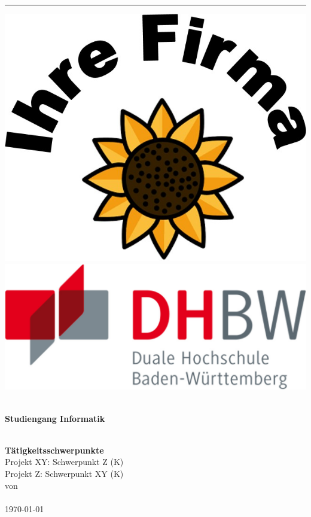 \begin{titlepage}
			\begin{center}
				\rule[0.5cm]{150mm}{0.2mm}
			\end{center}
			\hspace*{0.5cm}	
			\includegraphics[scale=0.2]{./img/Firmenlogo.jpg} \hfill
			\includegraphics[scale=0.09]{./img/DHBW-Logo.jpg} 
			\hspace*{0.3cm}
		\vspace{5cm}
		\begin{center}
		{\textbf{\Large{}\DerTitelDerArbeit}} \\[1.5cm]
		{\textbf{\large{}Studiengang Informatik}}\\[1cm]
		{\large{}\DieHochschule}\\[1.5cm]
\begin{minipage}{\textwidth}
		\centering
		{\textbf{\large{}Tätigkeitsschwerpunkte}} \\[0.2cm]
		Projekt XY: Schwerpunkt Z (K)\\[0.2cm]
		Projekt Z: Schwerpunkt XY (K)\\[1.5cm]
		von\\[1.5mm]
		\DerAutorDerArbeit\\[1cm]
		\today 
		\vspace*{2cm}
\end{minipage}


\end{center}
\end{titlepage}
